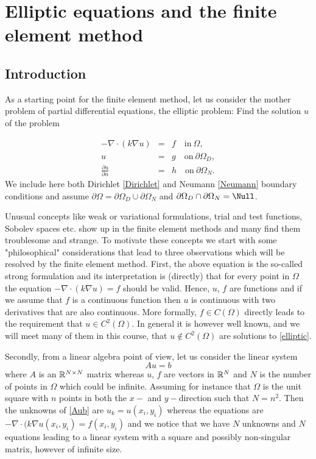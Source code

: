 \chapter{Elliptic equations and the finite element method}




\label{elliptic}
\section{Introduction}

As a starting point for the finite element method, let us
consider the mother problem of partial differential equations, 
the elliptic problem: Find the solution $u$ of the problem

\begin{eqnarray}
\label{elliptic}
-\nabla\cdot(k\nabla u)  &=& f \quad \textrm{in}\ \Omega,\\
\label{Dirichlet}
u&=& g \quad \textrm{on}\ \partial\Omega_D, \\
\label{Neumann}
\frac{\partial u}{\partial n}&=& h \quad \textrm{on}\ \partial\Omega_N . 
\end{eqnarray}
We include here both Dirichlet \eqref{Dirichlet} and Neumann \eqref{Neumann} boundary conditions
and assume $\partial \Omega = \partial \Omega_D \cup \partial \Omega_N$ 
and $\partial \Omega_D \cap \partial \Omega_N = \Null$.
 

Unusual concepts like weak or variational formulations, trial and test functions, Sobolev
spaces etc. show up in the finite element methods and many find them troublesome and strange. To motivate
these concepts we start with some "philosophical" considerations that lead to three observations which 
will be resolved by the finite element method. First, the above equation is 
the so-called strong formulation and its interpretation is (directly) that for every point in $\Omega$
the equation $ -\nabla\cdot(k\nabla u)  = f$ should be valid. Hence, $u$, $f$ are functions and
if we assume that $f$ is a continuous function then $u$ is continuous with two derivatives that are also continuous.   
More formally, $f\in C(\Omega)$ directly leads to the requirement that $u\in C^2(\Omega)$. In general 
it is however well known, and we will meet many of them in this course, that $u \not \in C^2(\Omega)$ are
solutions to \eqref{elliptic}. 

Secondly, from a linear algebra point of view, let us consider the linear system 
\begin{equation}
\label{Aub}
A u = b 
\end{equation}
where $A$ is an $\mathbb{R}^{N\times N}$ matrix whereas $u$, $f$ are vectors in $\mathbb{R}^N$ and 
$N$ is the number of points in $\Omega$ which could be infinite. Assuming for instance
that $\Omega$ is the unit square with $n$ points in both the $x-$ and $y-$direction such 
that $N=n^2$. Then the unknowns of 
\eqref{Aub} are $u_k = u(x_i, y_i)$ whereas
the equations are     
$-\nabla\cdot (k \nabla  u(x_i, y_i) = f(x_i, y_i)$ and we notice that
we have $N$ unknowns and $N$ equations leading to a linear system with 
a square and possibly non-singular matrix, however of infinite size.  

